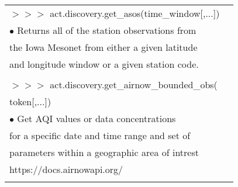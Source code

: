 \documentclass[potrait, z1paper, fontscale=0.33]{baposter} %
\begin{document}
\begin{poster}
{\begin{flushleft}
\begin{tabular}{@{}ll@{}}
\\
$>$$>$$>$ act.discovery.get\_asos(time\_window[,...])\\
\-\hspace{0.2cm} $\bullet$ Returns all of the station observations from\\
\-\hspace{0.5cm} the Iowa Mesonet from either a given latitude\\
\-\hspace{0.5cm} and longitude window or a given station code.\\
\\
$>$$>$$>$ act.discovery.get\_airnow\_bounded\_obs(\\
\-\hspace{1.5cm} token[,...])\\
\-\hspace{0.2cm} $\bullet$ Get AQI values or data concentrations\\
\-\hspace{0.5cm} for a specific date and time range and set of\\
\-\hspace{0.5cm} parameters within a geographic area of intrest\\
\-\hspace{0.5cm} https://docs.airnowapi.org/\\
\\
\end{tabular}
\end{flushleft}

}


\end{poster}
\end{document}
